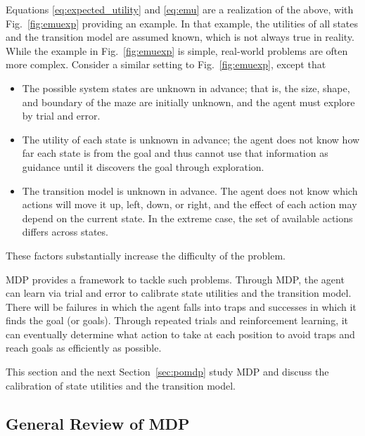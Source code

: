 Equations \eqref{eq:expected_utility} and \eqref{eq:emu} are a realization of the above, with Fig.~\ref{fig:emuexp} providing an example. In that example, the utilities of all states and the transition model are assumed known, which is not always true in reality. While the example in Fig.~\ref{fig:emuexp} is simple, real-world problems are often more complex. Consider a similar setting to Fig.~\ref{fig:emuexp}, except that
\begin{itemize}
	\item The possible system states are unknown in advance; that is, the size, shape, and boundary of the maze are initially unknown, and the agent must explore by trial and error.
	\item The utility of each state is unknown in advance; the agent does not know how far each state is from the goal and thus cannot use that information as guidance until it discovers the goal through exploration.
	\item The transition model is unknown in advance. The agent does not know which actions will move it up, left, down, or right, and the effect of each action may depend on the current state. In the extreme case, the set of available actions differs across states.
\end{itemize}
These factors substantially increase the difficulty of the problem.

MDP provides a framework to tackle such problems. Through MDP, the agent can learn via trial and error to calibrate state utilities and the transition model. There will be failures in which the agent falls into traps and successes in which it finds the goal (or goals). Through repeated trials and reinforcement learning, it can eventually determine what action to take at each position to avoid traps and reach goals as efficiently as possible.

This section and the next Section~\ref{sec:pomdp} study MDP and discuss the calibration of state utilities and the transition model.

\subsection{General Review of MDP}

